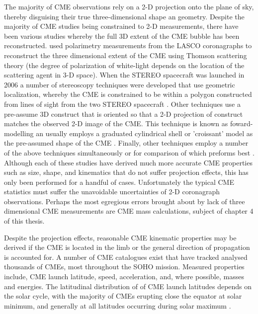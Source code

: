 The majority of CME observations rely on a 2-D projection onto the plane of sky, thereby  disguising their true three-dimensional shape an geometry. Despite the majority of CME studies being constrained to 2-D measurements, there have been various studies whereby the full 3D extent of the CME bubble has been reconstructed. \citep{moran2004} used polarimetry measurements from the LASCO coronagraphs to reconstruct the three dimensional extent of the CME using Thomson scattering theory (the degree of polarization of white-light depends on the location of the scattering agent in 3-D space). When the STEREO spacecraft was launched in 2006 a number of stereoscopy techniques were developed that use geometric localization, whereby the CME is constrained to be within a polygon constructed from lines of sight from the two STEREO spacecraft \citep{dekon2009, byrne2010}. Other techniques use a pre-assume 3D construct that is oriented so that a 2-D projection of construct matches the observed 2-D image of the CME. This technique is known as foward-modelling an usually employs a graduated cylindrical shell or 'croissant' model as the pre-assumed shape of the CME \citep{thern2006}. Finally, other techniques employ a number of the above techniques simultaneously or for comparison of which preforms best \citep{mierla2009}. Although each of these studies have derived much more accurate CME properties such as size, shape, and kinematics that do not suffer projection effects, this has only been performed for a handful of cases. Unfortunately the typical CME statistics must suffer the unavoidable uncertainties of 2-D coronagraph observations. Perhaps the most egregious errors brought about by lack of three dimensional CME measurements are CME mass calculations, subject of chapter 4 of this thesis.

Despite the projection effects, reasonable CME kinematic properties may be derived if the CME is located in the limb or the general direction of propagation is accounted for. A number of CME catalogues exist that have tracked analysed thousands of CMEs, most throughout the SOHO mission. Measured properties include, CME launch latitude, speed, acceleration, and, where possible, masses and energies. The latitudinal distribution of of CME launch latitudes depends on the solar cycle, with the majority of CMEs erupting close the equator at solar minimum, and generally at all latitudes occurring during solar maximum \citep{yashiro2004}.


